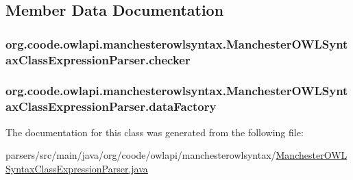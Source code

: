 \subsection{Member Data Documentation}
\hypertarget{classorg_1_1coode_1_1owlapi_1_1manchesterowlsyntax_1_1_manchester_o_w_l_syntax_class_expression_parser_ab53f75d7bb6ab9fa67c552c1aa8d2f65}{
\subsubsection[{checker}]{ org.\-coode.\-owlapi.\-manchesterowlsyntax.\-Manchester\-O\-W\-L\-Syntax\-Class\-Expression\-Parser.\-checker\hspace{0.3cm}{\ttfamily [private]}}}\label{classorg_1_1coode_1_1owlapi_1_1manchesterowlsyntax_1_1_manchester_o_w_l_syntax_class_expression_parser_ab53f75d7bb6ab9fa67c552c1aa8d2f65}
\hypertarget{classorg_1_1coode_1_1owlapi_1_1manchesterowlsyntax_1_1_manchester_o_w_l_syntax_class_expression_parser_ab1fffba70e8af6e119cf7cdccd25a7cc}{
\subsubsection[{data\-Factory}]{ org.\-coode.\-owlapi.\-manchesterowlsyntax.\-Manchester\-O\-W\-L\-Syntax\-Class\-Expression\-Parser.\-data\-Factory\hspace{0.3cm}{\ttfamily [private]}}}\label{classorg_1_1coode_1_1owlapi_1_1manchesterowlsyntax_1_1_manchester_o_w_l_syntax_class_expression_parser_ab1fffba70e8af6e119cf7cdccd25a7cc}


The documentation for this class was generated from the following file\-:\begin{DoxyCompactItemize}
\item 
parsers/src/main/java/org/coode/owlapi/manchesterowlsyntax/\hyperlink{_manchester_o_w_l_syntax_class_expression_parser_8java}{Manchester\-O\-W\-L\-Syntax\-Class\-Expression\-Parser.\-java}\end{DoxyCompactItemize}
